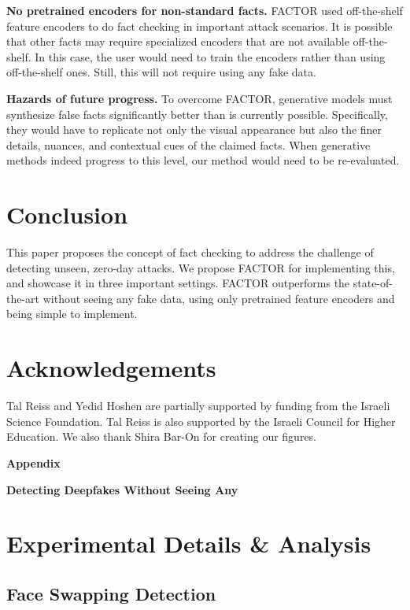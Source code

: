 \documentclass{article} \usepackage{iclr2024_conference,times}
\begin{document}
\textbf{No pretrained encoders for non-standard facts.} FACTOR used off-the-shelf feature encoders to do fact checking in important attack scenarios. It is possible that other facts may require specialized encoders that are not available off-the-shelf. In this case, the user would need to train the encoders rather than using off-the-shelf ones. Still, this will not require using any fake data. 

\textbf{Hazards of future progress.} To overcome FACTOR, generative models must synthesize false facts significantly better than is currently possible. Specifically, they would have to replicate not only the visual appearance but also the finer details, nuances, and contextual cues of the claimed facts. When generative methods indeed progress to this level, our method would need to be re-evaluated.

\section{Conclusion}
This paper proposes the concept of fact checking to address the challenge of detecting unseen, zero-day attacks. We propose FACTOR for implementing this, and showcase it in three important settings. FACTOR outperforms the state-of-the-art without seeing any fake data, using only pretrained feature encoders and being simple to implement.

\section*{Acknowledgements}
Tal Reiss and Yedid Hoshen are partially supported by funding from the Israeli Science Foundation. Tal Reiss is also supported by the Israeli Council for Higher Education. We also thank Shira Bar-On for creating our figures.





\newpage
\clearpage
\appendix

\centerline{\textbf{\LARGE Appendix}}
\vspace{1.5em}
\centerline{\textbf{\Large Detecting Deepfakes Without Seeing Any}}
\vspace{1em}


\section{Experimental Details \& Analysis}

\subsection{Face Swapping Detection}
\label{app:face_forgery}
\end{document}
